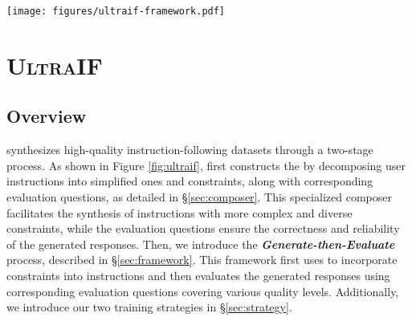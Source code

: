 \begin{figure*}[t]
    \centering
    \texttt{[image: figures/ultraif-framework.pdf]}
    \caption{The framework of \method. Specifically, \method begins by training the \textbf{\textit{\composer}}, which decomposes real-world user instructions and evaluation questions. For (a), the given instruction can be decomposed into several pairs, such as the numeric constraint `ten books' and content constraint `Chinese books'. Next, \method adopts a \textbf{\textit{Generate-then-Evaluate}} process, where the composer iteratively adds multiple constraints to each collected instruction and then applies the evaluation questions for rejection sampling.
    }
    \label{fig:ultraif}
\end{figure*}

\section{\textsc{UltraIF}}
\subsection{Overview}

\method synthesizes high-quality instruction-following datasets through a two-stage process. As shown in Figure \ref{fig:ultraif}, \method first constructs the \textbf{\textit{\composer}} by decomposing user instructions into simplified ones and constraints, along with corresponding evaluation questions, as detailed in \S\ref{sec:composer}. This specialized composer facilitates the synthesis of instructions with more complex and diverse constraints, while the evaluation questions ensure the correctness and reliability of the generated responses.
Then, we introduce the \textbf{\textit{Generate-then-Evaluate}} process, described in \S\ref{sec:framework}. This framework first uses \composer to incorporate constraints into instructions and then evaluates the generated responses using corresponding evaluation questions covering various quality levels.
Additionally, we introduce our two training strategies in \S\ref{sec:strategy}.



